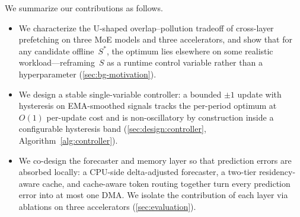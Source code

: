 We summarize our contributions as follows.
\begin{itemize}[leftmargin=1.4em, itemsep=2pt, topsep=2pt]
    \item We characterize the U-shaped overlap--pollution tradeoff of cross-layer prefetching on three MoE models and three accelerators, and show that for any candidate offline~$S^*$, the optimum lies elsewhere on some realistic workload---reframing~$S$ as a runtime control variable rather than a hyperparameter (\autoref{sec:bg-motivation}).
    \item We design a stable single-variable controller: a bounded $\pm 1$ update with hysteresis on EMA-smoothed signals tracks the per-period optimum at $O(1)$ per-update cost and is non-oscillatory by construction inside a configurable hysteresis band (\autoref{sec:design:controller}, Algorithm~\ref{alg:controller}).
    \item We co-design the forecaster and memory layer so that prediction errors are absorbed locally: a CPU-side delta-adjusted forecaster, a two-tier residency-aware cache, and cache-aware token routing together turn every prediction error into at most one DMA. We isolate the contribution of each layer via ablations on three accelerators (\autoref{sec:evaluation}).
\end{itemize}
